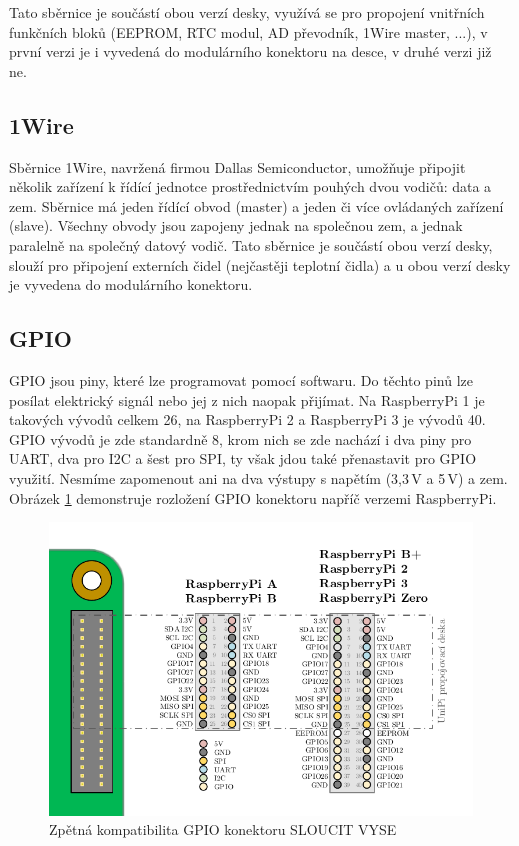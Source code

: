Tato sběrnice je součástí obou verzí desky, využívá se pro propojení vnitřních funkčních bloků (EEPROM, RTC modul, AD převodník, 1Wire master, ...), v první verzi je i vyvedená do modulárního konektoru na desce, v druhé verzi již ne.

\subsection{1Wire}
Sběrnice 1Wire, navržená firmou Dallas Semiconductor, umožňuje připojit několik zařízení k řídící jednotce prostřednictvím pouhých dvou vodičů: data a zem. Sběrnice má jeden řídící obvod (master) a jeden či více ovládaných zařízení (slave). Všechny obvody jsou zapojeny jednak na společnou zem, a jednak paralelně na společný datový vodič. Tato sběrnice je součástí obou verzí desky, slouží pro připojení externích čidel (nejčastěji teplotní čidla) a u obou verzí desky je vyvedena do modulárního konektoru.

\subsection{GPIO}
\label{KapGPIO}
GPIO jsou piny, které lze programovat pomocí softwaru. Do těchto pinů lze posílat elektrický signál nebo jej z nich naopak přijímat. Na RaspberryPi 1 je takových vývodů celkem 26, na RaspberryPi 2 a RaspberryPi 3 je vývodů 40. GPIO vývodů je zde standardně 8, krom nich se zde nachází i dva piny pro UART, dva pro I2C a šest pro SPI, ty však jdou také přenastavit pro GPIO využití. Nesmíme zapomenout ani na dva výstupy s napětím (3,3\,V a 5\,V) a zem.
Obrázek \ref{ObrazekGPIO} demonstruje rozložení GPIO konektoru napříč verzemi RaspberryPi.

\begin{figure}[!ht]
  \begin{center}
    \includegraphics[scale=0.6]{obrazky/unipi_gpio}
  \end{center}
  \caption{Zpětná kompatibilita GPIO konektoru \cite{SberniceGPIO} \colorbox[rgb]{1,0,0}{SLOUCIT VYSE}}
	\label{ObrazekGPIO}
\end{figure}

